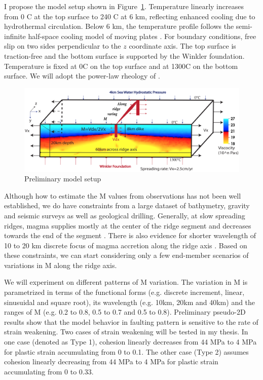 \documentclass[12pt]{article}
\begin{document}
I propose the model setup shown in Figure~\ref{fig8_1}. Temperature linearly increases from 0 \degree C at the top surface to 240 \degree C at 6 km, reflecting enhanced cooling due to hydrothermal circulation. Below 6 km, the temperature profile follows the semi-infinite half-space cooling model of moving plates \citep[e.g.,][]{Turcotte2002}. For boundary conditions, free slip on two sides perpendicular to the $z$ coordinate axis. The top surface is traction-free and the bottom surface is supported by the Winkler foundation. Temperature is fixed at 0\degree C on the top surface and at 1300\degree C on the bottom surface. We will adopt the power-law rheology of  \citep{Kirby1987}. 

\begin{figure}[H]
 \centering
  \includegraphics[scale=0.5]{fig8_1.png}
 \caption{\small Preliminary model setup}
 \label{fig8_1}
\end{figure}

Although how to estimate the M values from observations has not been well established, we do have constraints from a large dataset of bathymetry, gravity and seismic surveys as well as geological drilling. Generally, at slow spreading ridges, magma supplies mostly at the center of the ridge segment and decreases towards the end of the segment \citep{Tolstoy1993,Chen1999}. There is also evidence for shorter wavelength of 10 to 20 km discrete focus of magma accretion along the ridge axis \citep{Lin1990}. Based on these constraints, we can start considering only a few end-member scenarios of variations in M along the ridge axis. 

We will experiment on different patterns of M variation. The variation in M is parametrized in terms of the functional forms (e.g. discrete increment, linear, sinusuidal and square root), its wavelength (e.g. 10km, 20km and 40km) and the ranges of M (e.g. 0.2 to 0.8, 0.5 to 0.7 and 0.5 to 0.8). Preliminary pseudo-2D results show that the model behavior in faulting pattern is sensitive to the rate of strain weakening. Two cases of strain weakening will be tested in my thesis. In one case (denoted as Type 1), cohesion linearly decreases from 44 MPa to 4 MPa for plastic strain accumulating from 0 to 0.1. The other case (Type 2) assumes cohesion linearly decreasing from 44 MPa to 4 MPa for plastic strain accumulating from 0 to 0.33.
\end{document}
